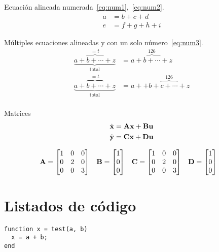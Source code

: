 Ecuación alineada numerada~\eqref{eq:num1},~\eqref{eq:num2}.
\begin{align}
a &= b + c + d \label{eq:num1} \\
e &= f + g + h + i \label{eq:num2}
\end{align}

Múltiples ecuaciones alineadas y con un solo número~\eqref{eq:num3}.
\begin{equation}
\begin{split}
\underbrace{a+\overbrace{b+\cdots}^{=t}+z}
_{\mathrm{total}} &= 
a+{\overbrace{b+\cdots}}^{126}+z \\
\underbrace{a+\overbrace{b+\cdots}^{=t}+z}
_{\mathrm{total}} &= 
a++b+{\overbrace{c+\cdots}}^{126}+z \\
\end{split}
\label{eq:num3}
\end{equation}

Matrices
\begin{align*}
\dot{\mathbf{x}} &= \mathbf{A}\mathbf{x} + \mathbf{B}\mathbf{u} \\
\dot{\mathbf{y}} &= \mathbf{C}\mathbf{x} + \mathbf{D}\mathbf{u}
\end{align*}

\begin{align*}
\vect{A} &= \begin{bmatrix}
1 & 0 & 0 \\
0 & 2 & 0 \\
0 & 0 & 3
\end{bmatrix}
%
&
%
\vect{B} &= \begin{bmatrix}
1  \\
0  \\
0 
\end{bmatrix}
%
&
%
\vect{C} &= \begin{bmatrix}
1 & 0 & 0 \\
0 & 2 & 0 \\
0 & 0 & 3
\end{bmatrix}
%
&
%
\vect{D} &= \begin{bmatrix}
1  \\
0  \\
0 
\end{bmatrix}
\end{align*}

\section{Listados de código}

\begin{lstlisting}[style=mlab, caption={código MATLAB.}]
function x = test(a, b)
  x = a + b;
end
\end{lstlisting}


